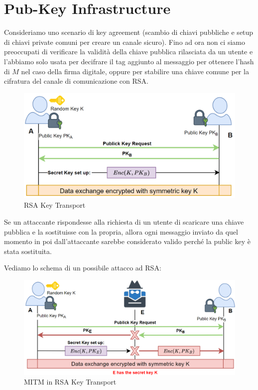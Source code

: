 \section{Pub-Key Infrastructure}
Consideriamo uno scenario di key agreement (scambio di chiavi pubbliche e setup di chiavi private comuni per creare un canale sicuro). Fino ad ora non ci siamo preoccupati di verificare la validità della chiave pubblica rilasciata da un utente e l'abbiamo solo usata per decifrare il tag aggiunto al messaggio per ottenere l'hash di $M$ nel caso della firma digitale, oppure per stabilire una chiave comune per la cifratura del canale di comunicazione con RSA. 
\begin{figure}[ht]
    \centering
    \includegraphics[width=\textwidth]{image/rsakeytrans.png}
    \caption{RSA Key Transport}
    \label{fig:rsakeytrans}
\end{figure}
\begin{note}Se un attaccante rispondesse alla richiesta di un utente di scaricare una chiave pubblica e la sostituisse con la propria, allora ogni messaggio inviato da quel momento in poi dall'attaccante sarebbe considerato valido perché la public key è stata sostituita. 
\end{note}
Vediamo lo schema di un possibile attacco ad RSA:
\begin{figure}[ht]
    \centering
    \includegraphics{image/mitmrsa.png}
    \caption{MITM in RSA Key Transport}
    \label{fig:mitmrsa}
\end{figure}\\
